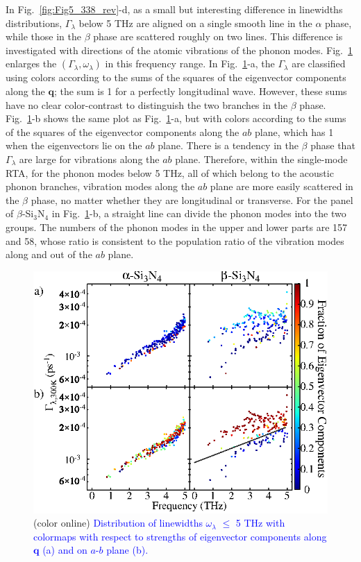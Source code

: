 \documentclass[twocolumn,amsmath,amssymb,a4paper,prb,superscriptaddress,floatfix]{revtex4-1}
\begin{document}
In Fig.~\ref{fig:Fig5_338_rev}-d, as a small but interesting difference in
linewidths distributions, $\Gamma_\lambda$ below 5 THz are aligned on a single
smooth line in the $\alpha$ phase, while those in the $\beta$ phase are
scattered roughly on two lines. This difference is investigated with directions
of the atomic vibrations of the phonon modes. Fig.~\ref{fig:Fig7_338} enlarges
the $(\Gamma_\lambda,\omega_\lambda)$ in this frequency range. In
Fig.~\ref{fig:Fig7_338}-a, the $\Gamma_\lambda$ are classified using colors
according to the sums of the squares of the eigenvector components along the
$\mathbf{q}$; the sum is 1 for a perfectly longitudinal wave. However, these
sums have no clear color-contrast to distinguish the two branches in the $\beta$
phase.  Fig.~\ref{fig:Fig7_338}-b shows the same plot as
Fig.~\ref{fig:Fig7_338}-a, but with colors according to the sums of the squares
of the eigenvector components along the $ab$ plane, which has 1 when the
eigenvectors lie on the $ab$ plane. There is a tendency in the $\beta$ phase
that  $\Gamma_\lambda$ are large for vibrations along the $ab$ plane.
Therefore, within the single-mode RTA, for the phonon modes below 5 THz, all of
which belong to the acoustic phonon branches, vibration modes along the $ab$
plane are more easily scattered in the $\beta$ phase, no matter whether they are
longitudinal or transverse. For the panel of $\beta$-Si$_3$N$_4$ in
Fig.~\ref{fig:Fig7_338}-b, a straight line can divide the phonon modes into the
two groups. The numbers of the phonon modes in the upper and lower parts are 157
and 58, whose ratio is consistent to the population ratio of the vibration modes
along and out of the $ab$ plane.


\begin{figure}[ht]
 \centering
  \includegraphics[width=\linewidth]{figure_analyze_gamma3_m1010_print.eps} \caption{(color
	  online) \textcolor{blue}{Distribution of linewidths $\omega_\lambda$ $\leq$ 5 THz
		  with colormaps with respect to strengths of eigenvector components along $\mathbf q$ (a)
		  and on $a$-$b$ plane (b).} \label{fig:Fig7_338}} 
 \centering
\end{figure}
\end{document}
